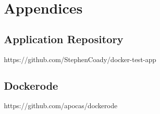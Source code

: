 \documentclass{article}
\begin{document}
\onehalfspacing
\hypersetup{pageanchor=false}

\hypersetup{pageanchor=true}
\newpage
\tableofcontents

\newpage
\printglossaries

\newpage


\newpage


\newpage


\newpage


\newpage


\newpage


\newpage
\appendix
\section*{Appendices}
\renewcommand{\thesubsection}{\Alph{subsection}}

\subsection*{Application Repository}
\label{appendix:code}
https://github.com/StephenCoady/docker-test-app

\subsection*{Dockerode}
\label{appendix:dockerode}
https://github.com/apocas/dockerode


\newpage

\end{document}
